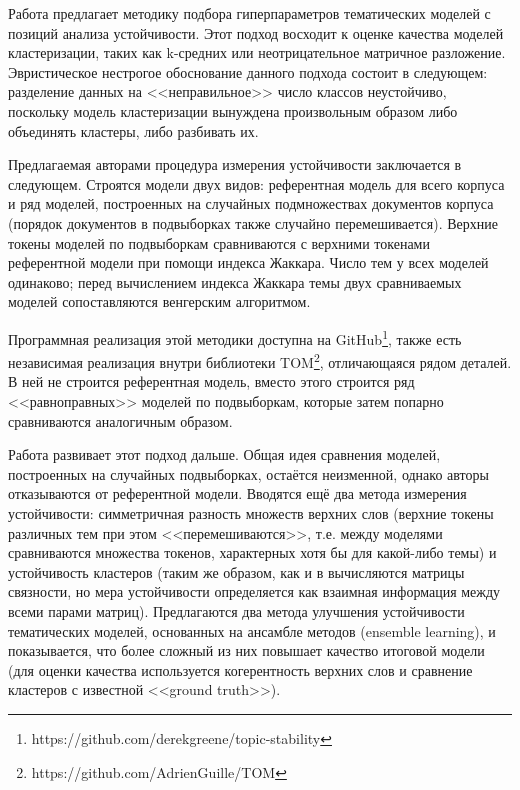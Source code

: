 Работа \cite{greene14howmany} предлагает методику подбора гиперпараметров тематических моделей с позиций анализа устойчивости. Этот подход восходит к оценке качества моделей кластеризации, таких как k-средних или неотрицательное матричное разложение. Эвристическое нестрогое обоснование данного подхода состоит в следующем: разделение данных на <<неправильное>> число классов неустойчиво, поскольку модель кластеризации вынуждена произвольным образом либо объединять кластеры, либо разбивать их.

Предлагаемая авторами процедура измерения устойчивости заключается в следующем. Строятся модели двух видов: референтная модель для всего корпуса и ряд моделей, построенных на случайных подмножествах документов корпуса (порядок документов в подвыборках также случайно перемешивается). Верхние токены моделей по подвыборкам сравниваются с верхними токенами референтной модели при помощи индекса Жаккара. Число тем у всех моделей одинаково; перед вычислением индекса Жаккара темы двух сравниваемых моделей сопоставляются венгерским алгоритмом.

Программная реализация этой методики доступна на GitHub\footnote{https://github.com/derekgreene/topic-stability}, также есть независимая реализация внутри библиотеки TOM\footnote{https://github.com/AdrienGuille/TOM}, отличающаяся рядом деталей. В ней не строится референтная модель, вместо этого строится ряд <<равноправных>> моделей по подвыборкам, которые затем попарно сравниваются аналогичным образом.

Работа \cite{belford2018stability} развивает этот подход дальше. Общая идея сравнения моделей, построенных на случайных подвыборках, остаётся неизменной, однако авторы отказываются от референтной модели. Вводятся ещё два метода измерения устойчивости: симметричная разность множеств верхних слов (верхние токены различных тем при этом <<перемешиваются>>, т.е. между моделями сравниваются множества токенов, характерных хотя бы для какой-либо темы) и устойчивость кластеров (таким же образом, как и в \cite{Brunet4164} вычисляются матрицы связности, но мера устойчивости определяется как взаимная информация между всеми парами матриц). Предлагаются два метода улучшения устойчивости тематических моделей, основанных на ансамбле методов (ensemble learning), и показывается, что более сложный из них повышает качество итоговой модели (для оценки качества используется когерентность верхних слов и сравнение кластеров с известной <<ground truth>>).

